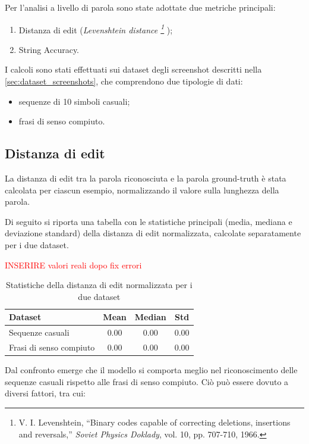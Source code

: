 Per l'analisi a livello di parola sono state adottate due metriche principali:
\begin{enumerate}
    \item Distanza di edit (\emph{Levenshtein distance \footnote{V. I. Levenshtein, “Binary codes capable of correcting deletions, insertions and reversals,” \textit{Soviet Physics Doklady}, vol. 10, pp. 707-710, 1966.} });
    \item String Accuracy.
\end{enumerate}

I calcoli sono stati effettuati sui dataset degli screenshot descritti nella \autoref{sec:dataset_screenshots}, che comprendono due tipologie di dati:
\begin{itemize}
    \item sequenze di 10 simboli casuali;
    \item frasi di senso compiuto.
\end{itemize}

\subsection{Distanza di edit}

La distanza di edit tra la parola riconosciuta e la parola ground-truth è stata calcolata per ciascun esempio, normalizzando il valore sulla lunghezza della parola.

Di seguito si riporta una tabella con le statistiche principali (media, mediana e deviazione standard) della distanza di edit normalizzata, calcolate separatamente per i due dataset.

\textcolor{red}{INSERIRE valori reali dopo fix errori}

\begin{table}[htbp]
    \centering
    \begin{tabular}{lccc}
        \toprule
        Dataset & Mean & Median & Std \\
        \midrule
        Sequenze casuali & 0.00 & 0.00 & 0.00 \\
        Frasi di senso compiuto & 0.00 & 0.00 & 0.00 \\
        \bottomrule
    \end{tabular}
    \caption{Statistiche della distanza di edit normalizzata per i due dataset}
    \label{tab:edit_distance_stats}
\end{table}

Dal confronto emerge che il modello si comporta meglio nel riconoscimento delle sequenze casuali rispetto alle frasi di senso compiuto. Ciò può essere dovuto a diversi fattori, tra cui:


